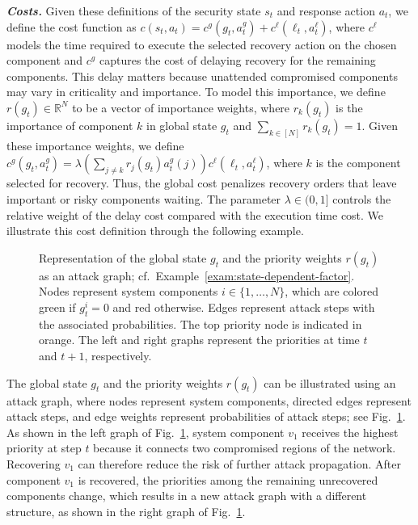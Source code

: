 \documentclass[runningheads,10pt]{llncs}
\begin{document}
\noindent\textit{\textbf{Costs.}}
Given these definitions of the security state $s_t$ and response action $a_t$, we define the cost function as $
c(s_t,a_t)=c^g(g_t, a_t^g)+c^\ell(\ell_t, a^\ell_t)$,
where $c^\ell$ models the time required to execute the selected recovery action on the chosen component and $c^g$ captures the cost of delaying recovery for the remaining components. This delay matters because unattended compromised components may vary in criticality and importance. To model this importance, we define $r(g_t)\in \mathbb{R}^N$ to be a vector of importance weights, where $r_k(g_t)$ is the importance of component $k$ in global state $g_t$ and $\sum_{k\in[N]} r_k(g_t)=1$. Given these importance weights, we define $c^g(g_t,a_t^g) = \lambda \left(\sum_{j\neq k} r_j(g_t)a_t^g(j)\right) c^\ell(\ell_t,a_t^\ell)$,
where $k$ is the component selected for recovery. Thus, the global cost penalizes recovery orders that leave important or risky components waiting. The parameter $\lambda\in(0,1]$ controls the relative weight of the delay cost compared with the execution time cost.
We illustrate this cost definition through the following example.
\begin{figure}[!h]
  \centering
  \scalebox{1}{

}
\caption{Representation of the global state $g_t$ and the priority weights $r(g_t)$ as an attack graph; cf.~Example~\ref{exam:state-dependent-factor}. Nodes represent system components $i\in \{1,\hdots,N\}$, which are colored green if $g^i_t=0$ and red otherwise. Edges represent attack steps with the associated probabilities. The top priority node is indicated in orange. The left and right graphs represent the priorities at time $t$ and $t+1$, respectively.}
\label{fig:state-dependent-priority}
\end{figure}

\begin{example}
\label{exam:state-dependent-factor}
The global state $g_t$ and the priority weights $r(g_t)$ can be illustrated using an attack graph, where nodes represent system components, directed edges represent attack steps, and edge weights represent probabilities of attack steps; see Fig.~\ref{fig:state-dependent-priority}. As shown in the left graph of Fig.~\ref{fig:state-dependent-priority}, system component $v_1$ receives the highest priority at step $t$ because it connects two compromised regions of the network. Recovering $v_1$ can therefore reduce the risk of further attack propagation. After component $v_1$ is recovered, the priorities among the remaining unrecovered components change, which results in a new attack graph with a different structure, as shown in the right graph of Fig.~\ref{fig:state-dependent-priority}.
\end{example}
\end{document}
